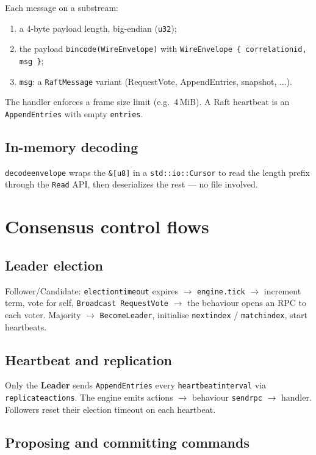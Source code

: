 \documentclass[11pt,a4paper]{article}
\newcommand{\code}[1]{{\def\_{\textunderscore\allowbreak}\texttt{#1}}}
\begin{document}
Each message on a substream:
\begin{enumerate}[nosep]
  \item a 4-byte payload length, big-endian (\code{u32});
  \item the payload \code{bincode(WireEnvelope)} with
        \code{WireEnvelope \{ correlation\_id, msg \}};
  \item \code{msg}: a \code{RaftMessage} variant (RequestVote, AppendEntries, snapshot, ...).
\end{enumerate}

The handler enforces a frame size limit (e.g.\ 4\,MiB). A Raft heartbeat is an
\code{AppendEntries} with empty \code{entries}.

\subsection{In-memory decoding}

\code{decode\_envelope} wraps the \code{\&[u8]} in a \code{std::io::Cursor} to read the length
prefix through the \code{Read} API, then deserializes the rest --- no file involved.

\section{Consensus control flows}

\subsection{Leader election}

Follower/Candidate: \code{election\_timeout} expires $\rightarrow$ \code{engine.tick} $\rightarrow$
increment term, vote for self, \code{Broadcast RequestVote} $\rightarrow$ the behaviour opens an RPC to
each voter. Majority $\rightarrow$ \code{BecomeLeader}, initialise \code{next\_index} /
\code{match\_index}, start heartbeats.

\subsection{Heartbeat and replication}

Only the \textbf{Leader} sends \code{AppendEntries} every \code{heartbeat\_interval} via
\code{replicate\_actions}. The engine emits actions $\rightarrow$ behaviour \code{send\_rpc}
$\rightarrow$ handler. Followers reset their election timeout on each heartbeat.

\subsection{Proposing and committing commands}
\end{document}
